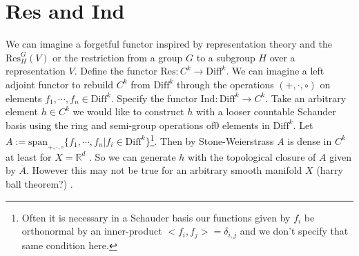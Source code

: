 \documentclass[10pt, oneside]{article}
\newcommand{\R}{\mathbb{R}}
\begin{document}
\section*{Res and Ind}
  We can imagine a forgetful functor inspired by representation theory and the $\text{Res}^G_H(V)$ or the restriction from a group $G$ to a subgroup $H$ over a representation $V$.
  Define the functor $\text{Res}: C^k \to \text{Diff}^k$. We can imagine a left adjoint functor to rebuild $C^k$ from $\text{Diff}^k$ through the operations $(+,\cdot,\circ)$ on elements $f_1, \cdots, f_n \in \text{Diff}^k$. Specify the functor $\text{Ind}: \text{Diff}^k \to C^k$.
  Take an arbitrary element $h \in C^k$ we would like to construct $h$ with a looser countable Schauder basis \cite{Heil2018} using the ring and semi-group operations of0 elements in $\text{Diff}^k$. Let $A := \text{span}_{+,\cdot,\circ} \{f_1, \cdots, f_n | f_i \in \text{Diff}^k\}$\footnote{Often it is necessary in a Schauder basis our functions given by $f_i$ be orthonormal by an inner-product $<f_i,f_j> = \delta_{i,j}$ and we don't specify that same condition here.}. Then by Stone-Weierstrass $A$ is dense in $C^k$ at least for $X=\R^d$ \cite{Dieudonne1969}.
  So we can generate $h$ with the topological closure of $A$ given by $\overline{A}$.
  However this may not be true for an arbitrary smooth manifold $X$ (harry ball theorem?) \cite{Dieudonne1969}.
\end{document}
